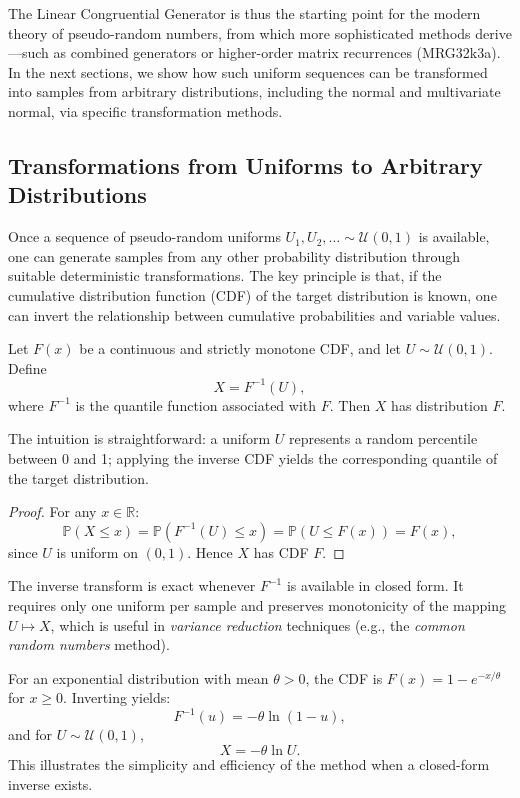 The Linear Congruential Generator is thus the starting point for the modern theory of pseudo-random numbers, from which more sophisticated methods derive—such as combined generators or higher-order matrix recurrences (MRG32k3a). 
In the next sections, we show how such uniform sequences can be transformed into samples from arbitrary distributions, including the normal and multivariate normal, via specific transformation methods.
\subsection{Transformations from Uniforms to Arbitrary Distributions} 

Once a sequence of pseudo-random uniforms \( U_1, U_2, \dots \sim \mathcal{U}(0,1) \) is available,
one can generate samples from any other probability distribution
through suitable deterministic transformations. 
The key principle is that, if the cumulative distribution function (CDF) of the target distribution is known, one can invert the relationship between cumulative probabilities and variable values.

\begin{definition}
Let \( F(x) \) be a continuous and strictly monotone CDF, and let \( U \sim \mathcal{U}(0,1) \).
Define
\[
X = F^{-1}(U),
\]
where \(F^{-1}\) is the quantile function associated with \(F\).
Then \(X\) has distribution \(F\).
\end{definition}

\noindent
The intuition is straightforward: a uniform \(U\) represents a random percentile between 0 and 1; 
applying the inverse CDF yields the corresponding quantile of the target distribution.

\begin{proof}[Proof]
For any \(x \in \mathbb{R}\):
\[
\mathbb{P}(X \leq x) = \mathbb{P}(F^{-1}(U) \leq x) 
= \mathbb{P}(U \leq F(x)) = F(x),
\]
since \(U\) is uniform on \((0,1)\). 
Hence \(X\) has CDF \(F\).
\end{proof}

\begin{remark}
The inverse transform is exact whenever \(F^{-1}\) is available in closed form. 
It requires only one uniform per sample and preserves monotonicity of the mapping \(U \mapsto X\), 
which is useful in \emph{variance reduction} techniques (e.g., the \emph{common random numbers} method).
\end{remark}

\begin{example}
For an exponential distribution with mean \(\theta > 0\), 
the CDF is \( F(x) = 1 - e^{-x / \theta} \) for \(x \geq 0\). 
Inverting yields:
\[
F^{-1}(u) = -\theta \ln(1 - u),
\]
and for \(U \sim \mathcal{U}(0,1)\),
\[
X = -\theta \ln U.
\]
This illustrates the simplicity and efficiency of the method when a closed-form inverse exists.
\end{example}




